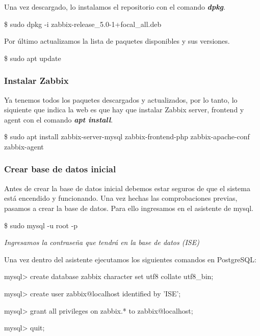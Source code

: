     Una vez descargado, lo instalamos el repositorio con el comando \textbf{\emph{dpkg}}.
        \begin{tcolorbox}[colback=black!10, halign=left]
            \$ sudo dpkg -i zabbix-release\_5.0-1+focal\_all.deb
        \end{tcolorbox}

    Por último actualizamos la lista de paquetes disponibles y sus versiones.
        \begin{tcolorbox}[colback=black!10, halign=left]
            \$ sudo apt update
        \end{tcolorbox}

    \newpage
    \subsubsection{Instalar Zabbix}

    Ya tenemos todos los paquetes descargados y actualizados, por lo tanto, lo siquiente que indica la web es que hay que instalar Zabbix server, frontend
    y agent con el comando \textbf{\emph{apt install}}.
        \begin{tcolorbox}[colback=black!10, halign=left]
            \$ sudo apt install zabbix-server-mysql zabbix-frontend-php zabbix-apache-conf zabbix-agent
        \end{tcolorbox}
    
    \subsubsection{Crear base de datos inicial}
    Antes de crear la base de datos inicial debemos estar seguros de que el sistema está encendido y funcionando. Una vez hechas las comprobaciones previas,
    pasamos a crear la base de datos. Para ello ingresamos en el asistente de mysql.
        \begin{tcolorbox}[colback=black!10, halign=left]
            \$ sudo mysql -u root -p

            \emph{Ingresamos la contraseña que tendrá en la base de datos (ISE)}
        \end{tcolorbox}

    Una vez dentro del asistente ejecutamos los siguientes comandos en PostgreSQL:
        \begin{tcolorbox}[colback=black!10, halign=left]
            mysql> create database zabbix character set utf8 collate utf8\_bin;

            mysql> create user zabbix@localhost identified by 'ISE';

            mysql> grant all privileges on zabbix.* to zabbix@localhost;

            mysql> quit;
        \end{tcolorbox}

